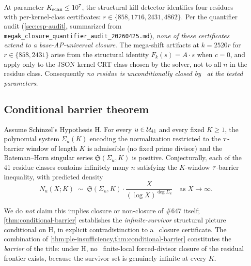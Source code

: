 \begin{remark}
\label{rem:per-kernel-class}
At parameter $K_{\rm scan} \le 10^7$, the structural-kill detector
identifies four residues with per-kernel-class certificates:
$r \in \{858, 1716, 2431, 4862\}$. Per the quantifier audit
(\cref{sec:csp-audit}, summarized from
\texttt{megak\_closure\_quantifier\_audit\_20260425.md}),
\emph{none of these certificates extend to a base-AP-universal
closure}. The mega-shift artifacts at $k = 2520 r$ for $r \in \{858, 2431\}$
arise from the structural identity $F_k(s) = A \cdot s$ when $c = 0$,
and apply only to the JSON kernel CRT class chosen by the solver,
not to all $n$ in the residue class. Consequently \emph{no residue is
unconditionally closed by \PLEclass\ at the tested parameters}.
\end{remark}

\subsection{Conditional barrier theorem}
\label{sec:thm:conditional-barrier}

\begin{theorem}
\label{thm:conditional-barrier}
Assume Schinzel's Hypothesis H. For every $u \in \mathcal{U}_{41}$ and every
fixed $K \ge 1$, the polynomial system $\Sigma_u(K)$ encoding the
 normalization restricted to the
$\tau$-barrier window of length $K$ is admissible (no fixed prime
divisor) and the Bateman--Horn singular series
$\mathfrak{S}(\Sigma_u, K)$ is positive. Conjecturally, each of the
41 residue classes contains infinitely many $n$ satisfying the
$K$-window $\tau$-barrier inequality, with predicted density
\[
N_u(X; K) \;\sim\; \mathfrak{S}(\Sigma_u, K) \cdot \frac{X}{(\log X)^{\deg \Sigma_u}}
\quad \text{as } X \to \infty.
\]
\end{theorem}

\begin{remark}
We do \emph{not} claim this implies closure or non-closure of
\#647 itself; \cref{thm:conditional-barrier} establishes the
\emph{infinite-survivor} structural picture conditional on H, in
explicit contradistinction to a \PLEclass\ closure certificate. The
combination of \cref{thm:ple-insufficiency,thm:conditional-barrier}
constitutes the \emph{barrier} of the title: under H, no \PLEclass\
finite-local forced-divisor closure of the residual frontier exists,
because the survivor set is genuinely infinite at every $K$.
\end{remark}

